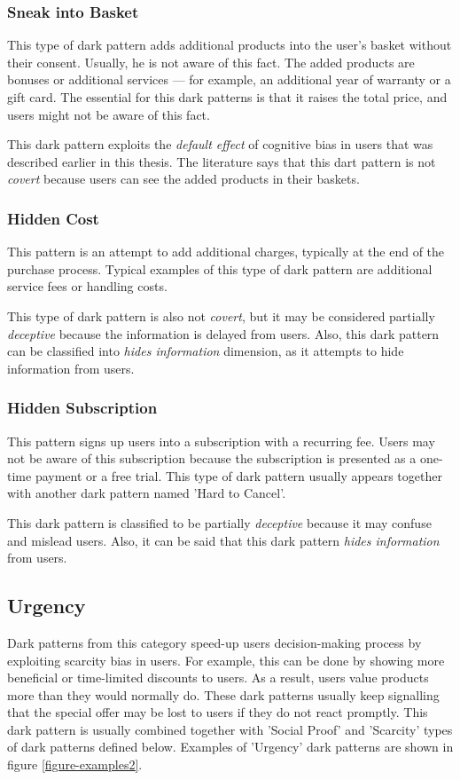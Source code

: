         \subsubsection{Sneak into Basket}
        This type of dark pattern adds additional products into the user's basket without their consent. Usually, he is not aware of this fact. The added products are bonuses or additional services — for example, an additional year of warranty or a gift card. The essential for this dark patterns is that it raises the total price, and users might not be aware of this fact. 
        
        This dark pattern exploits the \emph{default effect} of cognitive bias in users that was described earlier in this thesis. The literature says that this dart pattern is not \emph{covert} because users can see the added products in their baskets.
        \subsubsection{Hidden Cost}
        This pattern is an attempt to add additional charges, typically at the end of the purchase process. Typical examples of this type of dark pattern are additional service fees or handling costs. 
        
        This type of dark pattern is also not \emph{covert}, but it may be considered partially \emph{deceptive} because the information is delayed from users. Also, this dark pattern can be classified into \emph{hides information} dimension, as it attempts to hide information from users.
        \subsubsection{Hidden Subscription}
        This pattern signs up users into a subscription with a recurring fee. Users may not be aware of this subscription because the subscription is presented as a one-time payment or a free trial. This type of dark pattern usually appears together with another dark pattern named 'Hard to Cancel'. 
        
        This dark pattern is classified to be partially \emph{deceptive} because it may confuse and mislead users. Also, it can be said that this dark pattern \emph{hides information} from users.
    \subsection{Urgency}
    Dark patterns from this category speed-up users decision-making process by exploiting scarcity bias in users. For example, this can be done by showing more beneficial or time-limited discounts to users. As a result, users value products more than they would normally do. These dark patterns usually keep signalling that the special offer may be lost to users if they do not react promptly. This dark pattern is usually combined together with 'Social Proof' and 'Scarcity' types of dark patterns defined below. Examples of 'Urgency' dark patterns are shown in figure \ref{figure-examples2}.
